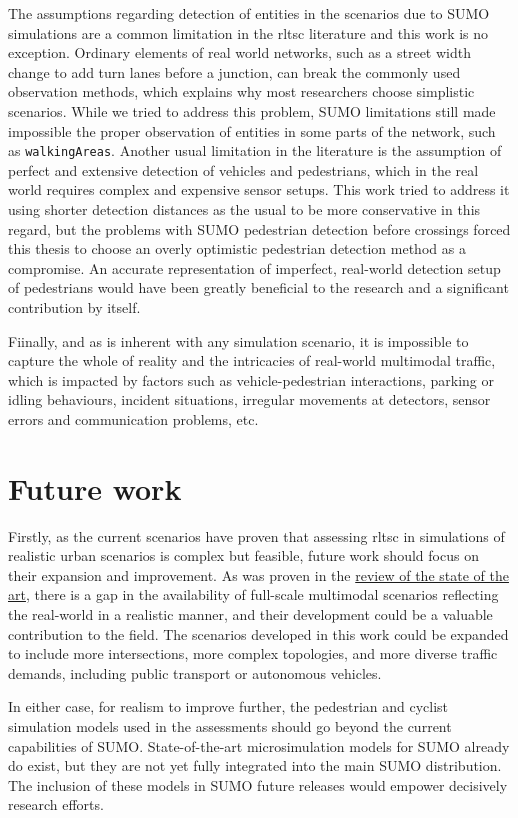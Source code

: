 The assumptions regarding detection of entities in the scenarios due to SUMO simulations are a common limitation in the \gls{rltsc} literature and this work is no exception. Ordinary elements of real world networks, such as a street width change to add turn lanes before a junction, can break the commonly used observation methods, which explains why most researchers choose simplistic scenarios. While we tried to address this problem, SUMO limitations still made impossible the proper observation of entities in some parts of the network, such as \texttt{walkingAreas}. Another usual limitation in the literature is the assumption of perfect and extensive detection of vehicles and pedestrians, which in the real world requires complex and expensive sensor setups. This work tried to address it using shorter detection distances as the usual to be more conservative in this regard, but the problems with SUMO pedestrian detection before crossings forced this thesis to choose an overly optimistic pedestrian detection method as a compromise. An accurate representation of imperfect, real-world detection setup of pedestrians would have been greatly beneficial to the research and a significant contribution by itself.

Fiinally, and as is inherent with any simulation scenario, it is impossible to capture the whole of reality and the intricacies of real-world multimodal traffic, which is impacted by factors such as vehicle-pedestrian interactions, parking or idling behaviours, incident situations, irregular movements at detectors, sensor errors and communication problems, etc.

\section{Future work}

Firstly, as the current scenarios have proven that assessing \gls{rltsc} in simulations of realistic urban scenarios is complex but feasible, future work should focus on their expansion and improvement. As was proven in the \hyperref[subsec:rlformtsc]{review of the state of the art}, there is a gap in the availability of full-scale multimodal scenarios reflecting the real-world in a realistic manner, and their development could be a valuable contribution to the field. The scenarios developed in this work could be expanded to include more intersections, more complex topologies, and more diverse traffic demands, including public transport or autonomous vehicles.

In either case, for realism to improve further, the pedestrian and cyclist simulation models used in the assessments should go beyond the current capabilities of SUMO. State-of-the-art microsimulation models for SUMO already do exist, but they are not yet fully integrated into the main SUMO distribution. The inclusion of these models in SUMO future releases would empower decisively research efforts.

